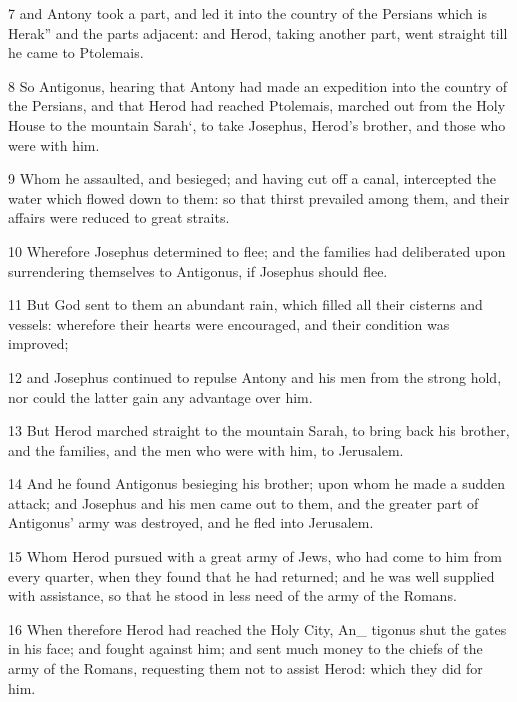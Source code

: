 \par 7 and Antony took a part, and led it into the country of the Persians which is Herak” and the parts adjacent: and Herod, taking another part, went straight till he came to Ptolemais. 

\par 8 So Antigonus, hearing that Antony had made an expedition into the country of the Persians, and that Herod had reached Ptolemais, marched out from the Holy House to the mountain Sarah‘, to take Josephus, Herod’s brother, and those who were with him. 

\par 9 Whom he assaulted, and besieged; and having cut off a canal, intercepted the water which flowed down to them: so that thirst prevailed among them, and their affairs were reduced to great straits. 

\par 10 Wherefore Josephus determined to flee; and the families had deliberated upon surrendering themselves to Antigonus, if Josephus should flee. 

\par 11 But God sent to them an abundant rain, which filled all their cisterns and vessels: wherefore their hearts were encouraged, and their condition was improved; 

\par 12 and Josephus continued to repulse Antony and his men from the strong hold, nor could the latter gain any advantage over him. 

\par 13 But Herod marched straight to the mountain Sarah, to bring back his brother, and the families, and the men who were with him, to Jerusalem. 

\par 14 And he found Antigonus besieging his brother; upon whom he made a sudden attack; and Josephus and his men came out to them, and the greater part of Antigonus’ army was destroyed, and he fled into Jerusalem. 

\par 15 Whom Herod pursued with a great army of Jews, who had come to him from every quarter, when they found that he had returned; and he was well supplied with assistance, so that he stood in less need of the army of the Romans. 

\par 16 When therefore Herod had reached the Holy City, An_ tigonus shut the gates in his face; and fought against him; and sent much money to the chiefs of the army of the Romans, requesting them not to assist Herod: which they did for him. 

